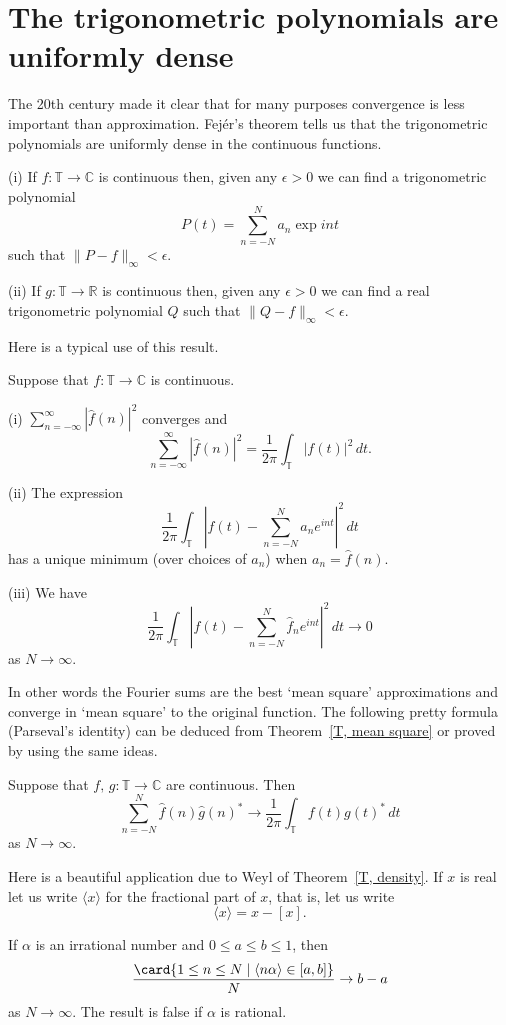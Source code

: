 \section{The trigonometric polynomials are uniformly dense}
The 20th century made it clear that for many purposes
convergence is less important than approximation.
Fej\'{e}r's theorem tells us that the trigonometric
polynomials are uniformly dense in the continuous functions.
\begin{theorem}\label{T, density}
(i) If $f:{\mathbb T}\rightarrow{\mathbb C}$
is continuous then, given any $\epsilon>0$ we can find a
trigonometric polynomial
\[P(t)=\sum_{n=-N}^{N}a_{n}\exp int\]
such that $\|P-f\|_{\infty}<\epsilon$.

(ii) If $g:{\mathbb T}\rightarrow{\mathbb R}$
is continuous then, given any $\epsilon>0$ we can find a
real trigonometric polynomial $Q$
such that $\|Q-f\|_{\infty}<\epsilon$.
\end{theorem}

Here is a typical use of this result.
\begin{theorem}\label{T, mean square} Suppose that
$f:{\mathbb T}\rightarrow{\mathbb C}$
is continuous.

(i) $\sum_{n=-\infty}^{\infty}|\hat{f}(n)|^{2}$ converges
and
\[\sum_{n=-\infty}^{\infty}|\hat{f}(n)|^{2}=
\frac{1}{2\pi}\int_{\mathbb T}|f(t)|^{2}\,dt.\]

(ii) The expression
\[\frac{1}{2\pi}\int_{\mathbb T}\left|f(t)-\sum_{n=-N}^{N}a_{n}e^{int}\right|^{2}\,dt\]
has a unique minimum (over choices of $a_{n}$)  when $a_{n}=\hat{f}(n)$.

(iii) We have
\[\frac{1}{2\pi}\int_{\mathbb T}\left|f(t)-\sum_{n=-N}^{N}\hat{f}_{n}e^{int}\right|^{2}\,dt
\rightarrow 0\]
as $N\rightarrow\infty$.
\end{theorem}
In other words the Fourier sums are the best `mean square' approximations
and converge in `mean square' to the original function. The following
pretty formula (Parseval's identity) can be deduced from Theorem~\ref{T, mean square}
or proved by using the same ideas.
\begin{lemma} Suppose that
$f,\,g:{\mathbb T}\rightarrow{\mathbb C}$
are continuous. Then
\[\sum_{n=-N}^{N}\hat{f}(n)\hat{g}(n)^{*}\rightarrow
\frac{1}{2\pi}\int_{\mathbb T}f(t)g(t)^{*}\,dt\]
as $N\rightarrow\infty$.
\end{lemma}

Here is a beautiful application due to Weyl
of Theorem~\ref{T, density}. If $x$ is real
let us write $\langle x\rangle$ for the fractional part
of $x$, that is, let us write
\[\langle x\rangle=x-[x].\]
\begin{theorem}\label{Weyl} If $\alpha$ is an irrational
number and $0\leq a\leq b\leq 1$, then
\[\frac{\card\{1\leq n\leq N \mid \langle n\alpha\rangle
\in [a,b]\}}{N}
\rightarrow b-a\]
as $N\rightarrow\infty$. The result is false
if $\alpha$ is rational.
\end{theorem}

